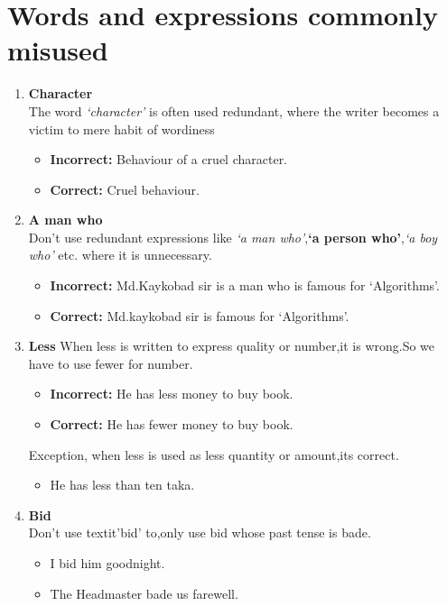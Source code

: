 \documentclass{report}
\begin{document}
\chapter{\color{blue}Words and expressions commonly misused}
\label{chap5}
\begin{enumerate}
	\item \textbf{Character}\\
	The word \textit{‘character’} is often used redundant, where the writer becomes a
	victim to mere habit of wordiness
	\begin{itemize}
		\item \textbf{Incorrect: } Behaviour of a cruel character.
		\item \textbf{Correct:} Cruel behaviour.
	\end{itemize}
	\item \textbf{A man who}\\
	Don’t use redundant expressions like \textit{‘a man who’},\textbf{‘a person who’},\textit{‘a boy who’} etc. where it is unnecessary.
	\begin{itemize}
		\item \textbf{Incorrect: } Md.Kaykobad sir is a man who is famous for ‘Algorithms’.
		\item \textbf{Correct:} Md.kaykobad sir is famous for ‘Algorithms’.
	\end{itemize}
	\item \textbf{Less}
	When less is written to express quality or number,it is wrong.So we have to use
	fewer for number.
	\begin{itemize}
		\item \textbf{Incorrect: } He has less money to buy book.
		\item \textbf{Correct:} He has fewer money to buy book.
	\end{itemize}
	Exception, when less is used as less quantity or amount,its correct.
	\begin{itemize}
		\item He has less than ten taka.
	\end{itemize}

	\item \textbf{Bid}\\
	Don’t use textit{'bid'} to,only use bid whose past tense is bade.
	\begin{itemize}
		\item I bid him goodnight.
		\item The Headmaster bade us farewell.
	\end{itemize}


\end{enumerate}
\end{document}
